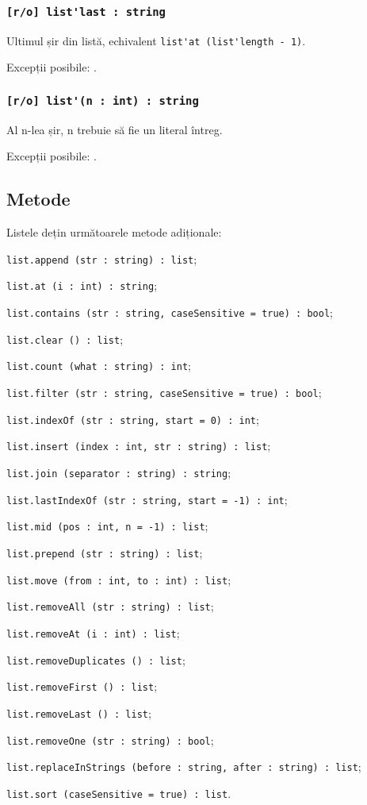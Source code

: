 \subsubsection{\lstinline|[r/o] list'last : string|}

Ultimul șir din listă, echivalent \lstinline|list'at (list'length - 1)|.

Excepții posibile: .

\subsubsection{\lstinline|[r/o] list'(n : int) : string|}

Al n-lea șir, n trebuie să fie un literal întreg.

Excepții posibile: .

\subsection{Metode}

Listele dețin următoarele metode adiționale:
\begin{icItems}
\item \lstinline|list.append (str : string) : list|;
\item \lstinline|list.at (i : int) : string|;
\item \lstinline|list.contains (str : string, caseSensitive = true) : bool|;
\item \lstinline|list.clear () : list|;
\item \lstinline|list.count (what : string) : int|;
\item \lstinline|list.filter (str : string, caseSensitive = true) : bool|;
\item \lstinline|list.indexOf (str : string, start = 0) : int|;
\item \lstinline|list.insert (index : int, str : string) : list|;
\item \lstinline|list.join (separator : string) : string|;
\item \lstinline|list.lastIndexOf (str : string, start = -1) : int|;
\item \lstinline|list.mid (pos : int, n = -1) : list|;
\item \lstinline|list.prepend (str : string) : list|;
\item \lstinline|list.move (from : int, to : int) : list|;
\item \lstinline|list.removeAll (str : string) : list|;
\item \lstinline|list.removeAt (i : int) : list|;
\item \lstinline|list.removeDuplicates () : list|;
\item \lstinline|list.removeFirst () : list|;
\item \lstinline|list.removeLast () : list|;
\item \lstinline|list.removeOne (str : string) : bool|;
\item \lstinline|list.replaceInStrings (before : string, after : string) : list|;
\item \lstinline|list.sort (caseSensitive = true) : list|.
\end{icItems}


